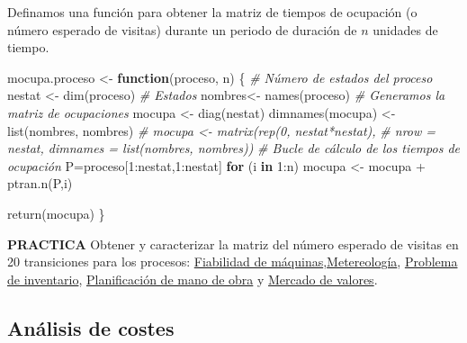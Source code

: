 \documentclass[
]{book}
\newenvironment{Shaded}{\begin{snugshade}}{\end{snugshade}}
\newcommand{\CommentTok}[1]{\textcolor[rgb]{0.56,0.35,0.01}{\textit{#1}}}
\newcommand{\ControlFlowTok}[1]{\textcolor[rgb]{0.13,0.29,0.53}{\textbf{#1}}}
\newcommand{\DecValTok}[1]{\textcolor[rgb]{0.00,0.00,0.81}{#1}}
\newcommand{\FunctionTok}[1]{\textcolor[rgb]{0.00,0.00,0.00}{#1}}
\newcommand{\NormalTok}[1]{#1}
\newcommand{\OtherTok}[1]{\textcolor[rgb]{0.56,0.35,0.01}{#1}}
\newcommand{\SpecialCharTok}[1]{\textcolor[rgb]{0.00,0.00,0.00}{#1}}
\newenvironment{bluebox}{
  \definecolor{shadecolor}{rgb}{176, 196, 222}  
  \color{black}
  \begin{shaded}}
 {\end{shaded}}
\newenvironment{whitebox}{
  \definecolor{shadecolor}{rgb}{255, 255, 255}  
  \color{black}
  \begin{shaded}}
 {\end{shaded}}
\theoremstyle{definition}
\theoremstyle{definition}
\theoremstyle{definition}
\theoremstyle{definition}
\theoremstyle{remark}
\begin{document}
\begin{whitebox}

Definamos una función para obtener la matriz de tiempos de ocupación (o número esperado de visitas) durante un periodo de duración de \(n\) unidades de tiempo.

\begin{Shaded}
\begin{Highlighting}[]
\NormalTok{mocupa.proceso }\OtherTok{\textless{}{-}} \ControlFlowTok{function}\NormalTok{(proceso, n)}
\NormalTok{\{}
  \CommentTok{\# Número de estados del proceso}
\NormalTok{  nestat }\OtherTok{\textless{}{-}} \FunctionTok{dim}\NormalTok{(proceso)}
  \CommentTok{\# Estados}
\NormalTok{  nombres}\OtherTok{\textless{}{-}} \FunctionTok{names}\NormalTok{(proceso)}
  \CommentTok{\# Generamos la matriz de ocupaciones}
\NormalTok{  mocupa }\OtherTok{\textless{}{-}} \FunctionTok{diag}\NormalTok{(nestat)}
  \FunctionTok{dimnames}\NormalTok{(mocupa) }\OtherTok{\textless{}{-}} \FunctionTok{list}\NormalTok{(nombres, nombres)}
\CommentTok{\#  mocupa \textless{}{-} matrix(rep(0, nestat*nestat),}
\CommentTok{\#                 nrow = nestat, dimnames = list(nombres, nombres))}
  \CommentTok{\# Bucle de cálculo de los tiempos de ocupación}
\NormalTok{  P}\OtherTok{=}\NormalTok{proceso[}\DecValTok{1}\SpecialCharTok{:}\NormalTok{nestat,}\DecValTok{1}\SpecialCharTok{:}\NormalTok{nestat]}
  \ControlFlowTok{for}\NormalTok{ (i }\ControlFlowTok{in} \DecValTok{1}\SpecialCharTok{:}\NormalTok{n)}
\NormalTok{   mocupa }\OtherTok{\textless{}{-}}\NormalTok{ mocupa }\SpecialCharTok{+} \FunctionTok{ptran.n}\NormalTok{(P,i)}
  
  \FunctionTok{return}\NormalTok{(mocupa)}
\NormalTok{\}}
\end{Highlighting}
\end{Shaded}

\end{whitebox}

\begin{bluebox}
\textbf{PRACTICA} Obtener y caracterizar la matriz del número esperado de visitas en 20 transiciones para los procesos: \protect\hyperlink{fiabilidad}{Fiabilidad de máquinas},\protect\hyperlink{meteo}{Metereología}, \protect\hyperlink{inventario}{Problema de inventario}, \protect\hyperlink{planificacion}{Planificación de mano de obra} y \protect\hyperlink{mercadovalores}{Mercado de valores}.

\end{bluebox}

\hypertarget{anuxe1lisis-de-costes}{%
\subsection{Análisis de costes}\label{anuxe1lisis-de-costes}}
\end{document}
